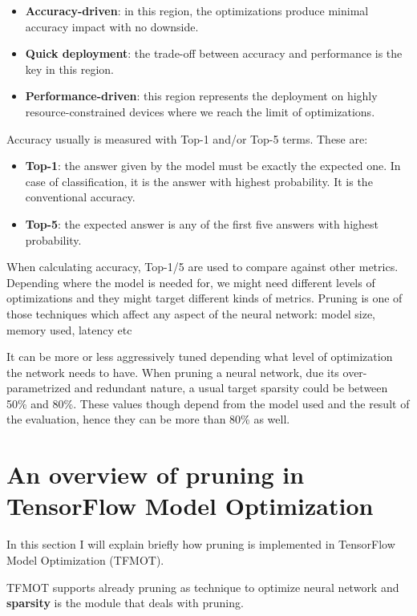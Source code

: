 \begin{itemize}
    \item \textbf{Accuracy-driven}: in this region, the optimizations produce
        minimal accuracy impact with no downside.
    \item \textbf{Quick deployment}: the trade-off between accuracy and
        performance is the key in this region.
    \item \textbf{Performance-driven}: this region represents the deployment on
        highly resource-constrained devices where we reach the limit of
        optimizations.
\end{itemize}

Accuracy usually is measured with Top-1 and/or Top-5 terms. These are:
\begin{itemize}
    \item \textbf{Top-1}: the answer given by the model must be exactly the
        expected one. In case of classification, it is the answer with highest
        probability. It is the conventional accuracy.
    \item \textbf{Top-5}: the expected answer is any of the first five answers
        with highest probability.
\end{itemize}

When calculating accuracy, Top-1/5 are used to compare against other metrics.
Depending where the model is needed for, we might need different levels of
optimizations and they might target different kinds of metrics.
Pruning is one of those techniques which affect any aspect of the neural
network: model size, memory used, latency etc

It can be more or less aggressively tuned depending what level of optimization
the network needs to have.
When pruning a neural network, due its over-parametrized and redundant nature,
a usual target sparsity could be between 50\% and 80\%.
These values though depend from the model used and the result of the
evaluation, hence they can be more than 80\% as well.

\section{An overview of pruning in TensorFlow Model Optimization}
In this section I will explain briefly how pruning is implemented in TensorFlow
Model Optimization (TFMOT).

TFMOT supports already pruning as technique to optimize neural network and
\textbf{sparsity} is the module that deals with pruning.

